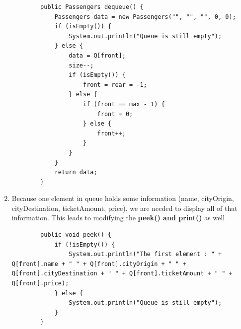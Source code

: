 \documentclass[12pt,titlepage]{article}
\begin{document}
\begin{enumerate}
\begin{verbatim}
        public Passengers dequeue() {
            Passengers data = new Passengers("", "", "", 0, 0);
            if (isEmpty()) {
                System.out.println("Queue is still empty");
            } else {
                data = Q[front];
                size--;
                if (isEmpty()) {
                    front = rear = -1;
                } else {
                    if (front == max - 1) {
                        front = 0;
                    } else {
                        front++;
                    }
                }
            }
            return data;
        }
    \end{verbatim}
    \item Because one element in queue holds some information (name, cityOrigin, cityDestination, ticketAmount, price), we are needed to display all of that information. This leads to modifying the \textbf{peek() and print()} as well
    \begin{verbatim}
        public void peek() {
            if (!isEmpty()) {
                System.out.println("The first element : " + Q[front].name + " " + Q[front].cityOrigin + " " + Q[front].cityDestination + " " + Q[front].ticketAmount + " " + Q[front].price);
            } else {
                System.out.println("Queue is still empty");
            }
        }


\end{verbatim}
\end{enumerate}
\end{document}
